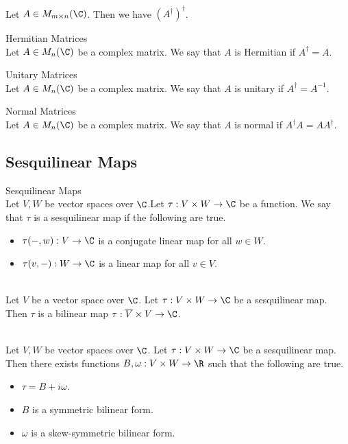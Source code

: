 \documentclass[a4paper]{article}
\begin{document}
\begin{prp}{}{}\\
Let $A\in M_{m\times n}(\C)$. Then we have $(A^\dagger)^\dagger$. 
\end{prp}

\begin{defn}{Hermitian Matrices}{}\\
Let $A\in M_n(\C)$ be a complex matrix. We say that $A$ is Hermitian if $A^\dagger=A$. 
\end{defn}

\begin{defn}{Unitary Matrices}{}\\
Let $A\in M_n(\C)$ be a complex matrix. We say that $A$ is unitary if $A^\dagger=A^{-1}$. 
\end{defn}

\begin{defn}{Normal Matrices}{}\\
Let $A\in M_n(\C)$ be a complex matrix. We say that $A$ is normal if $A^\dagger A=AA^\dagger$. 
\end{defn}

\subsection{Sesquilinear Maps}
\begin{defn}{Sesquilinear Maps}{}\\
Let $V,W$ be vector spaces over $\C$.Let $\tau:V\times W\to\C$ be a function. We say that $\tau$ is a sesquilinear map if the following are true. 
\begin{itemize}
\item $\tau(-,w):V\to\C$ is a conjugate linear map for all $w\in W$. 
\item $\tau(v,-):W\to\C$ is a linear map for all $v\in V$. 
\end{itemize}
\end{defn}

\begin{lmm}{}{}\\
Let $V$ be a vector space over $\C$. Let $\tau:V\times W\to\C$ be a sesquilinear map. Then $\tau$ is a bilinear map $\tau:\overline{V}\times V\to\C$. 
\end{lmm}

\begin{lmm}{}{}\\
Let $V,W$ be vector spaces over $\C$. Let $\tau:V\times W\to\C$ be a sesquilinear map. Then there exists functions $B,\omega:V\times W\to\R$ such that the following are true. 
\begin{itemize}
\item $\tau=B+i\omega$. 
\item $B$ is a symmetric bilinear form. 
\item $\omega$ is a skew-symmetric bilinear form. 
\end{itemize}
\end{lmm}
\end{document}
